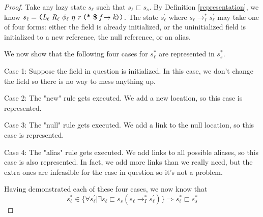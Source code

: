 \begin{proof}%
Take any lazy state $s_\ell$ such that $s_\ell \sqsubset s_s$. By Definition \ref{representation}, we know $s_\ell = \lp \cfgnt{L}_\ell\ \cfgnt{R}_\ell\ \phi_\ell\ \eta\ \cfgnt{r}\ \lp \cfgt{*}\ \cfgt{\$}\ \cfgnt{f} \rightarrow \cfgnt{k}\rp \rp$. The state $s_\ell^\prime$ where $s_\ell \rightarrow_I^* s_\ell^\prime$ may take one of four forms: either the field is already initialized, or the uninitialized field is initialized to a new reference, the null reference, or an alias.

We now show that the following four cases for $s_\ell^*$ are represented in $s_s^*$.

Case 1: Suppose the field in question is initialized. In this case, we don't change the field so there is no way to mess anything up.


Case 2: The "new" rule gets executed. We add a new location, so this case is represented.

Case 3: The "null" rule gets executed. We add a link to the null location, so this case is represented.

Case 4: The "alias" rule gets executed. We add links to all possible aliases, so this case is also represented. In fact, we add more links than we really need, but the extra ones are infeasible for the case in question so it's not a problem. 

Having demonstrated each of these four cases, we now know that 
$$s_\ell^* \in \{\forall s_\ell^\prime | \exists s_\ell \sqsubset s_s (s_\ell \rightarrow_I^* s_\ell^\prime)  \} \Rightarrow  s_\ell^* \sqsubset s_s^*$$


\end{proof}
